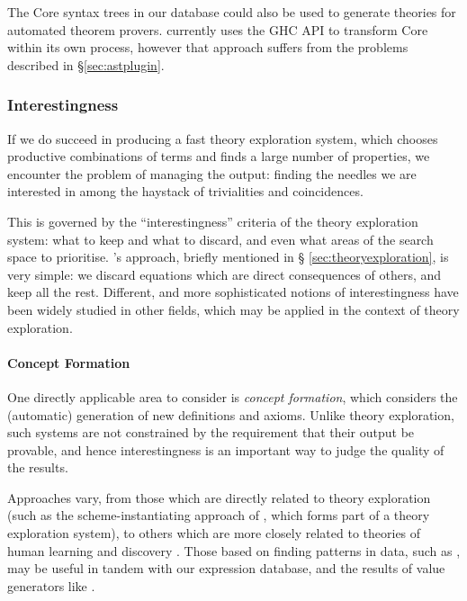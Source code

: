 The Core syntax trees in our database could also be used to generate theories
for automated theorem provers. \hspec{} currently uses the GHC API to transform
Core within its own process, however that approach suffers from the problems
described in \S \ref{sec:astplugin}.

\subsubsection{Interestingness}
\label{sec:interestingness}

If we do succeed in producing a fast theory exploration system, which chooses
productive combinations of terms and finds a large number of properties, we
encounter the problem of managing the output: finding the needles we are
interested in among the haystack of trivialities and coincidences.

This is governed by the ``interestingness'' criteria of the theory exploration
system: what to keep and what to discard, and even what areas of the search
space to prioritise. \qspec{}'s approach, briefly mentioned in \S
\ref{sec:theoryexploration}, is very simple: we discard equations which are
direct consequences of others, and keep all the rest. Different, and more
sophisticated notions of interestingness have been widely studied in other
fields, which may be applied in the context of theory exploration.

\paragraph{Concept Formation} \label{sec:conceptformation} \leavevmode \newline

One directly applicable area to consider is \emph{concept formation}, which
considers the (automatic) generation of new definitions and axioms. Unlike
theory exploration, such systems are not constrained by the requirement that
their output be provable, and hence interestingness is an important way to judge
the quality of the results.

Approaches vary, from those which are directly related to theory exploration
(such as the scheme-instantiating approach of
\cite{Montano-Rivas.McCasland.Dixon.ea:2012}, which forms part of a theory
exploration system), to others which are more closely related to theories of
human learning and discovery \cite{Piantadosi.Tenenbaum.Goodman:2012,
  mullerunderstanding}. Those based on finding patterns in data, such as
\cite{Wille:2005}, may be useful in tandem with our expression database, and
the results of value generators like \qcheck{}.

